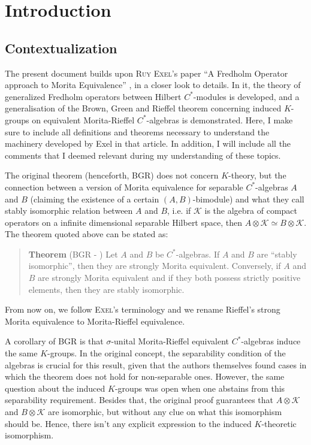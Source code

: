 \chapter*{Introduction}

\section*{Contextualization}

The present document builds upon \textsc{Ruy Exel}'s paper ``A Fredholm Operator approach to Morita Equivalence'' \cite{exel7fredholm}, in a closer look to details. In it, the theory of generalized Fredholm operators between Hilbert $C^*$-modules is developed, and a generalisation of the Brown, Green and Rieffel theorem concerning induced $K$-groups on equivalent Morita-Rieffel $C^*$-algebras is demonstrated. Here, I make sure to include all definitions and theorems necessary to understand the machinery developed by Exel in that article. In addition, I will include all the comments that I deemed relevant during my understanding of these topics.

The original theorem (henceforth, BGR) does not concern $K$-theory, but the connection between a version of Morita equivalence for separable $C^*$-algebras $A$ and $B$ (claiming the existence of a certain $(A,B)$-bimodule) and what they call stably isomorphic relation between $A$ and $B$, i.e. if $\mathscr K$ is the algebra of compact operators on a infinite dimensional separable Hilbert space, then $A\otimes \mathscr K \simeq B\otimes \mathscr K$. The theorem quoted above can be stated as:
\begin{quote}
\textbf{Theorem} (BGR - \cite[Theorem 1.2]{brown1977morita}) 
Let $A$ and $B$ be $C^*$-algebras. If $A$ and $B$ are ``stably isomorphic'', then they are strongly Morita equivalent. Conversely, if $A$ and $B$ are strongly Morita equivalent and if they both possess strictly positive elements, then they are stably isomorphic.
\end{quote}

From now on, we follow \textsc{Exel}'s terminology and we rename Rieffel's strong Morita equivalence to Morita-Rieffel equivalence.

A corollary of BGR is that $\sigma$-unital Morita-Rieffel equivalent $C^*$-algebras induce the same $K$-groups. In the original concept, the separability condition of the algebras is crucial for this result, given that the authors themselves found cases in which the theorem does not hold for non-separable ones. However, the same question about the induced $K$-groups was open when one abstains from this separability requirement. Besides that, the original proof guarantees that $A\otimes \mathscr K$ and $B \otimes \mathscr K$ are isomorphic, but without any clue on what this isomorphism should be. Hence, there isn't any explicit expression to the induced $K$-theoretic isomorphism.

